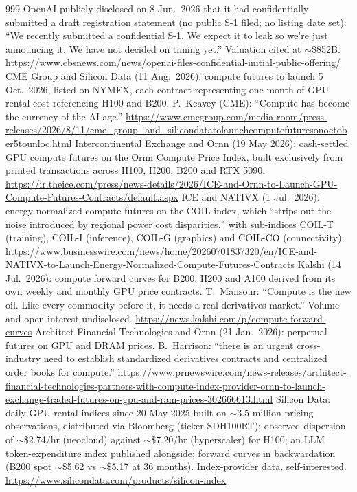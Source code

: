\begin{thebibliography}{999}
 OpenAI publicly disclosed on 8 Jun.\ 2026 that it had confidentially submitted a draft registration statement (no public S-1 filed; no listing date set): ``We recently submitted a confidential S-1. We expect it to leak so we're just announcing it. We have not decided on timing yet.'' Valuation cited at $\sim$\$852B. \url{https://www.cbsnews.com/news/openai-files-confidential-initial-public-offering/}
 CME Group and Silicon Data (11 Aug.\ 2026): compute futures to launch 5 Oct.\ 2026, listed on NYMEX, each contract representing one month of GPU rental cost referencing H100 and B200. P.~Keavey (CME): ``Compute has become the currency of the AI age.'' \url{https://www.cmegroup.com/media-room/press-releases/2026/8/11/cme_group_and_silicondatatolaunchcomputefuturesonoctober5tounloc.html}
 Intercontinental Exchange and Ornn (19 May 2026): cash-settled GPU compute futures on the Ornn Compute Price Index, built exclusively from printed transactions across H100, H200, B200 and RTX 5090. \url{https://ir.theice.com/press/news-details/2026/ICE-and-Ornn-to-Launch-GPU-Compute-Futures-Contracts/default.aspx}
 ICE and NATIVX (1 Jul.\ 2026): energy-normalized compute futures on the COIL index, which ``strips out the noise introduced by regional power cost disparities,'' with sub-indices COIL-T (training), COIL-I (inference), COIL-G (graphics) and COIL-CO (connectivity). \url{https://www.businesswire.com/news/home/20260701837320/en/ICE-and-NATIVX-to-Launch-Energy-Normalized-Compute-Futures-Contracts}
 Kalshi (14 Jul.\ 2026): compute forward curves for B200, H200 and A100 derived from its own weekly and monthly GPU price contracts. T.~Mansour: ``Compute is the new oil. Like every commodity before it, it needs a real derivatives market.'' Volume and open interest undisclosed. \url{https://news.kalshi.com/p/compute-forward-curves}
 Architect Financial Technologies and Ornn (21 Jan.\ 2026): perpetual futures on GPU and DRAM prices. B.~Harrison: ``there is an urgent cross-industry need to establish standardized derivatives contracts and centralized order books for compute.'' \url{https://www.prnewswire.com/news-releases/architect-financial-technologies-partners-with-compute-index-provider-ornn-to-launch-exchange-traded-futures-on-gpu-and-ram-prices-302666613.html}
 Silicon Data: daily GPU rental indices since 20 May 2025 built on $\sim$3.5 million pricing observations, distributed via Bloomberg (ticker SDH100RT); observed dispersion of $\sim$\$2.74/hr (neocloud) against $\sim$\$7.20/hr (hyperscaler) for H100; an LLM token-expenditure index published alongside; forward curves in backwardation (B200 spot $\sim$\$5.62 vs $\sim$\$5.17 at 36 months). Index-provider data, self-interested. \url{https://www.silicondata.com/products/silicon-index}

\end{thebibliography}
